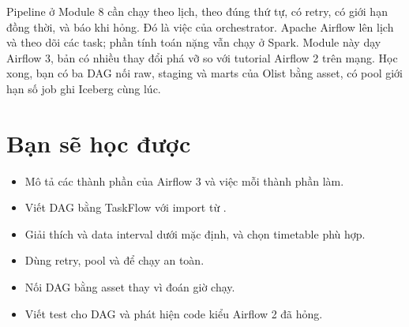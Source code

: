 
Pipeline ở Module 8 cần chạy theo lịch, theo đúng thứ tự, có retry, có giới hạn đồng thời, và báo khi hỏng. Đó là việc của orchestrator. Apache Airflow lên lịch và theo dõi các task; phần tính toán nặng vẫn chạy ở Spark. Module này dạy Airflow 3, bản có nhiều thay đổi phá vỡ so với tutorial Airflow 2 trên mạng. Học xong, bạn có ba DAG nối raw, staging và marts của Olist bằng asset, có pool giới hạn số job ghi Iceberg cùng lúc.

\section{Bạn sẽ học được}
\begin{itemize}
  \item Mô tả các thành phần của Airflow 3 và việc mỗi thành phần làm.
  \item Viết DAG bằng TaskFlow với import từ .
  \item Giải thích  và data interval dưới  mặc định, và chọn timetable phù hợp.
  \item Dùng retry, pool và  để chạy an toàn.
  \item Nối DAG bằng asset thay vì đoán giờ chạy.
  \item Viết test cho DAG và phát hiện code kiểu Airflow 2 đã hỏng.
\end{itemize}

